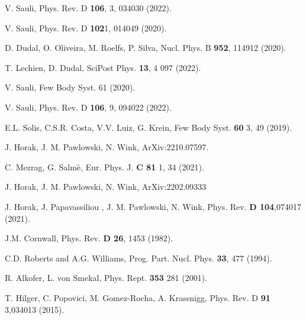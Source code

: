 \documentclass[aps,prd,superscriptaddress,eqsecnum,amsfonts,showpacs,epsfig]{revtex4}
\begin{document}
\begin{thebibliography}{00}
V. Sauli, Phys. Rev. D  {\bf 106}, 3, 034030 (2022).

V. Sauli, Phys. Rev. D {\bf 102}1, 014049 (2020).

D. Dudal, O. Oliveira, M. Roelfs, P. Silva,   Nucl. Phys. B {\bf 952}, 114912 (2020).

 T. Lechien, D. Dudal, SciPost Phys.  {\bf 13}, 4 097 (2022).

V. Sauli, Few Body Syst. 61 (2020).
  
V. Sauli, Phys. Rev. D {\bf 106}, 9, 094022 (2022).

E.L. Solis, C.S.R. Costa, V.V. Luiz, G. Krein, Few Body Syst. {\bf 60} 3, 49 (2019).

J. Horak, J. M. Pawlowski, N. Wink, ArXiv:2210.07597. 

C. Mezrag, G. Salmè, Eur. Phys. J. {\bf C 81} 1, 34 (2021).

J. Horak, J. M. Pawlowski, N. Wink, ArXiv:2202.09333

J. Horak, J. Papavassiliou , J. M. Pawlowski, N. Wink, Phys. Rev. {\bf D 104},074017 (2021).

J.M. Cornwall, Phys. Rev. {\bf D 26}, 1453 (1982).

 C.D. Roberts and  A.G. Williams, Prog. Part. Nucl. Phys. {\bf 33}, 477 (1994).
   
R. Alkofer, L. von Smekal, Phys. Rept. {\bf 353} 281 (2001).
  
T. Hilger, C. Popovici, M. Gomez-Rocha, A. Krassnigg, Phys. Rev. D {\bf 91} 3,034013 (2015).


\end{thebibliography}
\end{document}
